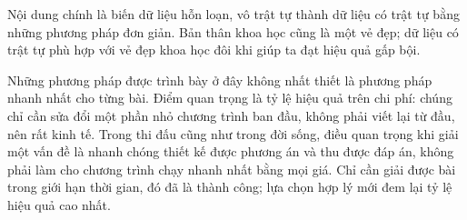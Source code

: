 \documentclass[11pt]{article}
\begin{document}
Nội dung chính là biến dữ liệu hỗn loạn, vô trật tự thành dữ liệu có trật tự
bằng những phương pháp đơn giản. Bản thân khoa học cũng là một vẻ đẹp; dữ liệu
có trật tự phù hợp với vẻ đẹp khoa học đôi khi giúp ta đạt hiệu quả gấp bội.

Những phương pháp được trình bày ở đây không nhất thiết là phương pháp nhanh
nhất cho từng bài. Điểm quan trọng là tỷ lệ hiệu quả trên chi phí: chúng chỉ
cần sửa đổi một phần nhỏ chương trình ban đầu, không phải viết lại từ đầu, nên
rất kinh tế. Trong thi đấu cũng như trong đời sống, điều quan trọng khi giải
một vấn đề là nhanh chóng thiết kế được phương án và thu được đáp án, không
phải làm cho chương trình chạy nhanh nhất bằng mọi giá. Chỉ cần giải được bài
trong giới hạn thời gian, đó đã là thành công; lựa chọn hợp lý mới đem lại tỷ
lệ hiệu quả cao nhất.
\end{document}
